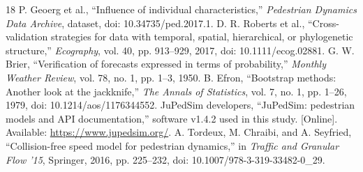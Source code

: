 \documentclass[conference]{IEEEtran}
\begin{document}
\begin{thebibliography}{18}
 P. Geoerg et al., ``Influence of individual characteristics,'' \emph{Pedestrian Dynamics Data Archive}, dataset, doi: 10.34735/ped.2017.1.
 D. R. Roberts et al., ``Cross-validation strategies for data with temporal, spatial, hierarchical, or phylogenetic structure,'' \emph{Ecography}, vol. 40, pp. 913--929, 2017, doi: 10.1111/ecog.02881.
 G. W. Brier, ``Verification of forecasts expressed in terms of probability,'' \emph{Monthly Weather Review}, vol. 78, no. 1, pp. 1--3, 1950.
 B. Efron, ``Bootstrap methods: Another look at the jackknife,'' \emph{The Annals of Statistics}, vol. 7, no. 1, pp. 1--26, 1979, doi: 10.1214/aos/1176344552.
 JuPedSim developers, ``JuPedSim: pedestrian models and API documentation,'' software v1.4.2 used in this study. [Online]. Available: \url{https://www.jupedsim.org/}.
 A. Tordeux, M. Chraibi, and A. Seyfried, ``Collision-free speed model for pedestrian dynamics,'' in \emph{Traffic and Granular Flow '15}, Springer, 2016, pp. 225--232, doi: 10.1007/978-3-319-33482-0\_29.
\end{thebibliography}
\end{document}
